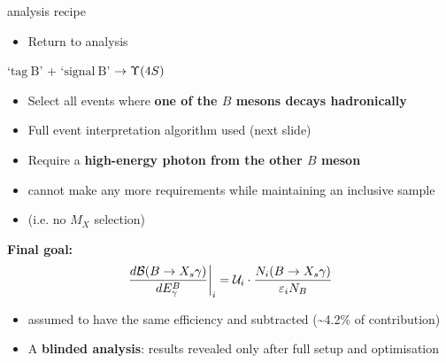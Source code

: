 \documentclass[xcolor=dvipsnames]{beamer}
\begin{document}
   \begin{frame}{\BtoXsgamma analysis recipe}
      \scriptsize\centering
      \begin{itemize}
         \item Return to \BtoXsgamma analysis
      \end{itemize}
      
      `$\mathrm{tag~B}$' + `$\mathrm{signal~B}$' $\ra \FourS$
     
      \begin{itemize}
         \item Select all events where \textbf{one of the $B$ mesons decays hadronically}
         \item[\to] Full event interpretation algorithm used (next slide)
         \item Require a \textbf{high-energy photon from the other $B$ meson}
         \item[\to] cannot make any more requirements while maintaining an inclusive sample 
         \item[] (i.e. no $M_X$ selection)
      \end{itemize}
\textbf{Final goal:}
      \begin{equation}\nonumber
         \left.\frac{d\mathcal{B}(\BtoXsgamma)}{d\EB}\right|_i = \mathcal{U}_i \cdot \frac{N_i(\BtoXsgamma)}{\varepsilon_i N_{B}}
      \end{equation}
      \begin{itemize}
         \item \BtoXdgamma assumed to have the same efficiency and subtracted (\sim 4.2\% of contribution)
         \item A \textbf{blinded analysis}: results revealed only after full setup and optimisation
      \end{itemize}
   \end{frame}
\end{document}
